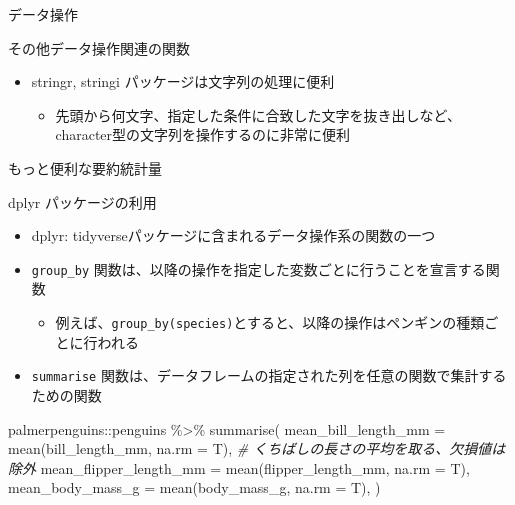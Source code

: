 \documentclass[
  ignorenonframetext,
]{beamer}
\newenvironment{Shaded}{\begin{snugshade}}{\end{snugshade}}
\newcommand{\AttributeTok}[1]{\textcolor[rgb]{0.77,0.63,0.00}{#1}}
\newcommand{\CommentTok}[1]{\textcolor[rgb]{0.56,0.35,0.01}{\textit{#1}}}
\newcommand{\FunctionTok}[1]{\textcolor[rgb]{0.00,0.00,0.00}{#1}}
\newcommand{\NormalTok}[1]{#1}
\newcommand{\SpecialCharTok}[1]{\textcolor[rgb]{0.00,0.00,0.00}{#1}}
\providecommand{\tightlist}{%
  \setlength{\itemsep}{0pt}\setlength{\parskip}{0pt}}
\begin{document}
\begin{frame}[fragile]{データ操作}
\begin{block}{その他データ操作関連の関数}
\protect\hypertarget{ux305dux306eux4ed6ux30c7ux30fcux30bfux64cdux4f5cux95a2ux9023ux306eux95a2ux6570}{}
\begin{itemize}
\tightlist
\item
  stringr, stringi パッケージは文字列の処理に便利

  \begin{itemize}
  \tightlist
  \item
    先頭から何文字、指定した条件に合致した文字を抜き出しなど、character型の文字列を操作するのに非常に便利
  \end{itemize}
\end{itemize}
\end{block}

\begin{block}{もっと便利な要約統計量}
\protect\hypertarget{ux3082ux3063ux3068ux4fbfux5229ux306aux8981ux7d04ux7d71ux8a08ux91cf}{}
\end{block}

\begin{block}{dplyr パッケージの利用}
\protect\hypertarget{dplyr-ux30d1ux30c3ux30b1ux30fcux30b8ux306eux5229ux7528}{}
\begin{itemize}
\tightlist
\item
  dplyr: tidyverseパッケージに含まれるデータ操作系の関数の一つ
\item
  \texttt{group\_by}
  関数は、以降の操作を指定した変数ごとに行うことを宣言する関数

  \begin{itemize}
  \tightlist
  \item
    例えば、\texttt{group\_by(species)}とすると、以降の操作はペンギンの種類ごとに行われる
  \end{itemize}
\item
  \texttt{summarise}
  関数は、データフレームの指定された列を任意の関数で集計するための関数
\end{itemize}

\begin{Shaded}
\begin{Highlighting}[]
\NormalTok{palmerpenguins}\SpecialCharTok{::}\NormalTok{penguins }\SpecialCharTok{\%\textgreater{}\%}
  \FunctionTok{summarise}\NormalTok{(}
    \AttributeTok{mean\_bill\_length\_mm =} \FunctionTok{mean}\NormalTok{(bill\_length\_mm, }\AttributeTok{na.rm =}\NormalTok{ T), }\CommentTok{\# くちばしの長さの平均を取る、欠損値は除外}
    \AttributeTok{mean\_flipper\_length\_mm =} \FunctionTok{mean}\NormalTok{(flipper\_length\_mm, }\AttributeTok{na.rm =}\NormalTok{ T),}
    \AttributeTok{mean\_body\_mass\_g =} \FunctionTok{mean}\NormalTok{(body\_mass\_g, }\AttributeTok{na.rm =}\NormalTok{ T),}
\NormalTok{  )}
\end{Highlighting}
\end{Shaded}


\end{block}
\end{frame}
\end{document}
